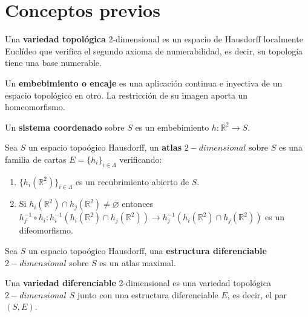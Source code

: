 
\chapter{Conceptos previos}

\begin{definicion} Una \textbf{variedad topológica} 2-dimensional es un espacio de Hausdorff localmente Euclídeo que verifica el segundo axioma de numerabilidad, es decir, su topología tiene una base numerable.
\end{definicion}

\begin{definicion} Un \textbf{embebimiento o encaje} es una aplicación continua e inyectiva de un espacio topológico en otro. La restricción de su imagen aporta un homeomorfismo.
\end{definicion}

\begin{definicion} Un \textbf{sistema coordenado} sobre $S$ es un embebimiento $h : \mathbb{R}^2 \rightarrow S$.
\end{definicion}

\begin{definicion} Sea $S$ un espacio topoógico Hausdorff, un \textbf{atlas} $2-dimensional$ sobre $S$ es una familia de cartas $E=\{h_i\}_{i\in \Lambda}$ verificando:
	\begin{enumerate}
		\item $\{h_i(\mathbb{R}^2)\}_{i\in \Lambda}$ es un recubrimiento abierto de $S$.
		\item Si $h_i(\mathbb{R}^2) \cap h_j(\mathbb{R}^2) \neq \varnothing$ entonces $h_j^{-1} \circ h_i:h_i^{-1}(h_i(\mathbb{R}^2)\cap h_j(\mathbb{R}^2)) \rightarrow h_j^{-1}(h_i(\mathbb{R}^2)\cap h_j(\mathbb{R}^2))$ es un difeomorfismo.
	\end{enumerate}
\end{definicion}

\begin{definicion} Sea $S$ un espacio topoógico Hausdorff, una \textbf{estructura diferenciable} $2-dimensional$ sobre $S$ es un atlas maximal.
\end{definicion}

\begin{definicion} Una \textbf{variedad diferenciable} 2-dimensional es una variedad topológica $2-dimensional$ $S$ junto con una estructura diferenciable $E$, es decir, el par $(S, E)$.
\end{definicion}

